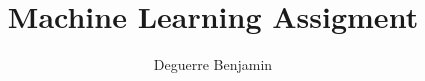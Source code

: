 \documentclass[a4paper, 11pt]{article}
\begin{document}
\title{Machine Learning Assigment}
\author{Deguerre Benjamin}

\maketitle

\newpage
\tableofcontents


\newpage


\newpage


\newpage


\newpage


\newpage


\newpage


\newpage
\end{document}
